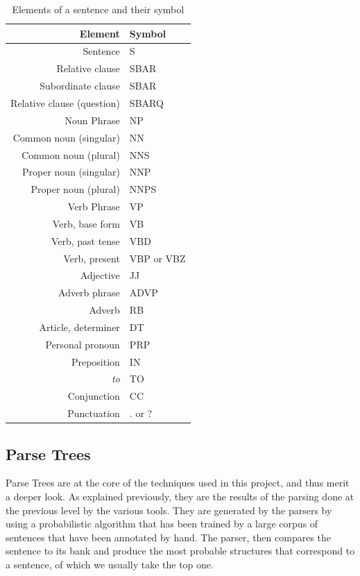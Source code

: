 \begin{table}[ht]
  \caption{Elements of a sentence and their symbol}
  \label{tab:penntree_symbols}
  \begin{center}
  \begin{tabular}{r l}
  Element & Symbol\\
  \hline
  Sentence & S\\
  Relative clause & SBAR\\
  Subordinate clause & SBAR\\
  Relative clause (question) & SBARQ\\
  Noun Phrase & NP\\
  Common noun (singular) & NN\\
  Common noun (plural) & NNS\\
  Proper noun (singular) & NNP\\
  Proper noun (plural) & NNPS\\
  Verb Phrase & VP\\
  Verb, base form & VB\\
  Verb, past tense & VBD\\
  Verb, present & VBP or VBZ\\
  Adjective & JJ\\
  Adverb phrase & ADVP\\
  Adverb & RB\\
  Article, determiner & DT\\
  Personal pronoun & PRP\\
  Preposition & IN\\
  \emph{to} & TO\\
  Conjunction & CC\\
  Punctuation & . or ?\\
  \end{tabular}
  \end{center}
\end{table}


\subsection{Parse Trees} %
\label{sub:parse_trees}

Parse Trees are at the core of the techniques used in this project, and thus merit a deeper look. As explained previously, they are the results of the parsing done at the previous level by the various tools. They are generated by the parsers by using a probabilistic algorithm that has been trained by a large corpus of sentences that have been annotated by hand. The parser, then compares the sentence to its bank and produce the most probable structures that correspond to a sentence, of which we usually take the top one.

